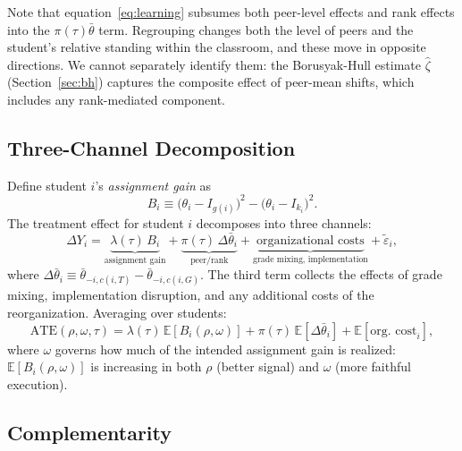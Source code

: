 \documentclass[11pt]{article}
\newcommand{\E}{\mathbb{E}}
\begin{document}
Note that equation~\eqref{eq:learning} subsumes both peer-level effects and rank effects into the $\pi(\tau)\bar{\theta}$ term. Regrouping changes both the level of peers and the student's relative standing within the classroom, and these move in opposite directions. We cannot separately identify them: the Borusyak-Hull estimate $\hat{\zeta}$ (Section~\ref{sec:bh}) captures the composite effect of peer-mean shifts, which includes any rank-mediated component.

\subsection{Three-Channel Decomposition}

Define student $i$'s \emph{assignment gain} as
\begin{equation}
\label{eq:Bi}
B_i \equiv \big(\theta_i - I_{g(i)}\big)^2 - \big(\theta_i - I_{k_i}\big)^2.
\end{equation}
The treatment effect for student $i$ decomposes into three channels:
\begin{equation}
\label{eq:decomp_full}
\Delta Y_i = \underbrace{\lambda(\tau)\, B_i}_{\text{assignment gain}} + \underbrace{\pi(\tau)\,\Delta\bar{\theta}_i}_{\text{peer/rank}} + \underbrace{\text{organizational costs}}_{\text{grade mixing, implementation}} + \tilde{\varepsilon}_i,
\end{equation}
where $\Delta\bar{\theta}_i \equiv \bar{\theta}_{-i,c(i,T)} - \bar{\theta}_{-i,c(i,G)}$. The third term collects the effects of grade mixing, implementation disruption, and any additional costs of the reorganization. Averaging over students:
\begin{equation}
\label{eq:ate}
\text{ATE}(\rho, \omega, \tau) = \lambda(\tau)\,\E[B_i(\rho, \omega)] + \pi(\tau)\,\E[\Delta\bar{\theta}_i] + \E[\text{org.\ cost}_i],
\end{equation}
where $\omega$ governs how much of the intended assignment gain is realized: $\E[B_i(\rho, \omega)]$ is increasing in both $\rho$ (better signal) and $\omega$ (more faithful execution).

\subsection{Complementarity}
\end{document}
